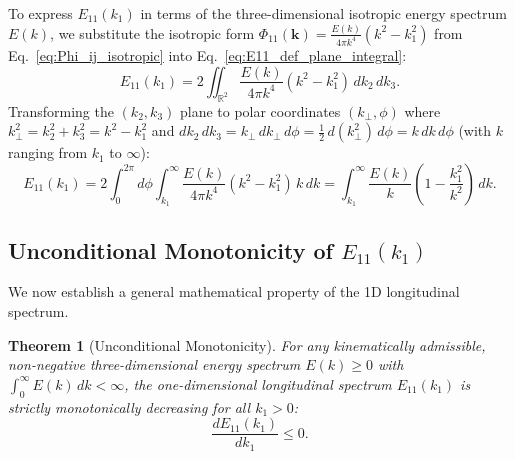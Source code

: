 \documentclass[lineno]{jfm}
\newtheorem{theorem}{Theorem}
\begin{document}
To express $E_{11}(k_1)$ in terms of the three-dimensional isotropic energy spectrum $E(k)$, we substitute the isotropic form $\Phi_{11}(\mathbf{k}) = \frac{E(k)}{4\pi k^4}(k^2 - k_1^2)$ from Eq.~\eqref{eq:Phi_ij_isotropic} into Eq.~\eqref{eq:E11_def_plane_integral}:
\begin{equation}
E_{11}(k_1) = 2 \iint_{\mathbb{R}^2} \frac{E(k)}{4\pi k^4} (k^2 - k_1^2)\,dk_2\,dk_3.
\end{equation}
Transforming the $(k_2, k_3)$ plane to polar coordinates $(k_\perp, \phi)$ where $k_\perp^2 = k_2^2 + k_3^2 = k^2 - k_1^2$ and $dk_2\,dk_3 = k_\perp\,dk_\perp\,d\phi = \frac{1}{2}\,d(k_\perp^2)\,d\phi = k\,dk\,d\phi$ (with $k$ ranging from $k_1$ to $\infty$):
\begin{equation}
E_{11}(k_1) = 2 \int_0^{2\pi} d\phi \int_{k_1}^\infty \frac{E(k)}{4\pi k^4} (k^2 - k_1^2)\,k\,dk = \int_{k_1}^\infty \frac{E(k)}{k} \left( 1 - \frac{k_1^2}{k^2} \right)\,dk.
\label{eq:E11_from_Ek}
\end{equation}

\subsection{Unconditional Monotonicity of \texorpdfstring{$E_{11}(k_1)$}{E11(k1)}}

We now establish a general mathematical property of the 1D longitudinal spectrum.

\begin{theorem}[Unconditional Monotonicity]
\label{thm:monotonicity}
For any kinematically admissible, non-negative three-dimensional energy spectrum $E(k) \ge 0$ with $\int_0^\infty E(k)\,dk < \infty$, the one-dimensional longitudinal spectrum $E_{11}(k_1)$ is strictly monotonically decreasing for all $k_1 > 0$:
\begin{equation}
\frac{d E_{11}(k_1)}{d k_1} \le 0.
\label{eq:thm_mono}
\end{equation}
\end{theorem}
\end{document}
